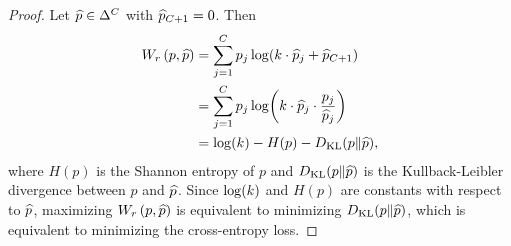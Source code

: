 \begin{proof}

    Let $\widehat{p}\in\Delta^C$ with $\widehat{p}_{C+1}=0$. Then
    \begin{align*}
        \W{r}
         & =
        \sum_{j=1}^{C}p_j\log\!\left(\costmult\cdot\phat_j+\phat_{C+1}\right)             \\
         & =
        \sum_{j=1}^{C}p_j\log\!\left(\costmult\cdot\phat_j\cdot\frac{p_j}{\phat_j}\right) \\
         & =
        \log\!\left(\costmult\right)
        -
        H(p)
        -
        D_{\text{KL}}(p\| \phat),
    \end{align*}
    where $H(p)$ is the Shannon entropy of $p$ and $D_{\text{KL}}(p\| \widehat{p})$ is the Kullback-Leibler divergence between $p$ and $\widehat{p}$. Since $\log\!\left(k\right)$ and $H(p)$ are constants with respect to $\widehat{p}$, maximizing $\W{r}$ is equivalent to minimizing $D_{\text{KL}}(p\| \widehat{p})$, which is equivalent to minimizing the cross-entropy loss.
\end{proof}
